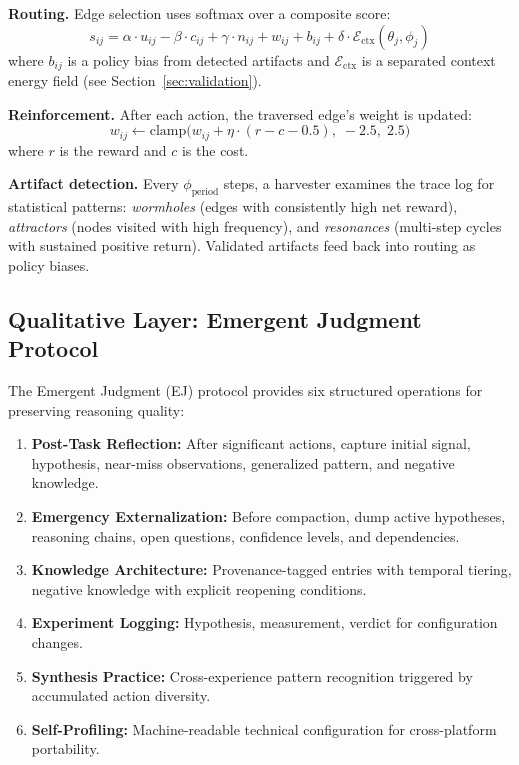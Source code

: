 \documentclass[11pt,a4paper]{article}
\begin{document}
\textbf{Routing.} Edge selection uses softmax over a composite score:
\begin{equation}
  s_{ij} = \alpha \cdot u_{ij} - \beta \cdot c_{ij} + \gamma \cdot n_{ij}
           + w_{ij} + b_{ij} + \delta \cdot \mathcal{E}_{\text{ctx}}(\theta_j, \phi_j)
  \label{eq:routing}
\end{equation}
where $b_{ij}$ is a policy bias from detected artifacts and
$\mathcal{E}_{\text{ctx}}$ is a separated context energy field
(see Section~\ref{sec:validation}).

\textbf{Reinforcement.} After each action, the traversed edge's
weight is updated:
\begin{equation}
  w_{ij} \leftarrow \text{clamp}\bigl(w_{ij} + \eta \cdot (r - c - 0.5),\; -2.5,\; 2.5\bigr)
\end{equation}
where $r$ is the reward and $c$ is the cost.

\textbf{Artifact detection.} Every $\phi_{\text{period}}$ steps, a
harvester examines the trace log for statistical patterns:
\emph{wormholes} (edges with consistently high net reward),
\emph{attractors} (nodes visited with high frequency), and
\emph{resonances} (multi-step cycles with sustained positive return).
Validated artifacts feed back into routing as policy biases.

\subsection{Qualitative Layer: Emergent Judgment Protocol}

The Emergent Judgment (EJ) protocol provides six structured operations
for preserving reasoning quality:

\begin{enumerate}[leftmargin=*]
\item \textbf{Post-Task Reflection:} After significant actions, capture
  initial signal, hypothesis, near-miss observations, generalized
  pattern, and negative knowledge.
\item \textbf{Emergency Externalization:} Before compaction, dump
  active hypotheses, reasoning chains, open questions, confidence
  levels, and dependencies.
\item \textbf{Knowledge Architecture:} Provenance-tagged entries with
  temporal tiering, negative knowledge with explicit reopening conditions.
\item \textbf{Experiment Logging:} Hypothesis, measurement, verdict
  for configuration changes.
\item \textbf{Synthesis Practice:} Cross-experience pattern recognition
  triggered by accumulated action diversity.
\item \textbf{Self-Profiling:} Machine-readable technical configuration
  for cross-platform portability.
\end{enumerate}
\end{document}
